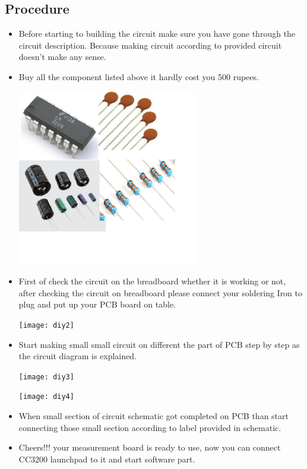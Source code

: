 \documentclass[a4paper,12pt,oneside]{book}
\begin{document}
\subsection*{Procedure}
\begin{itemize}
	\item Before starting to building the circuit make sure you have gone through the circuit description. Because making circuit according to provided circuit doesn't make any sense.\\
	\newpage
	\item Buy all the component listed above it hardly cost you 500 rupees.\\
	\begin{center}
		\includegraphics[width=300px]{diy1}
	\end{center}
	
	\item First of check the circuit on the breadboard whether it is working or not, after checking the circuit on breadboard please connect your soldering Iron to plug and put up your PCB board on table.\\
	\begin{center}
		\texttt{[image: diy2]}
	\end{center}
	\item Start making small small circuit on different the part of PCB step by step as the circuit diagram is explained.
	\begin{center}
		\texttt{[image: diy3]}
	\end{center}
	\begin{center}
		\texttt{[image: diy4]}
	\end{center}
	\item When small section of circuit schematic got completed on PCB than start connecting those small section according to label provided in schematic.
	\item Cheers!!! your measurement board is ready to use, now you can connect CC3200 launchpad to it and start software part. 
\end{itemize}
\end{document}
